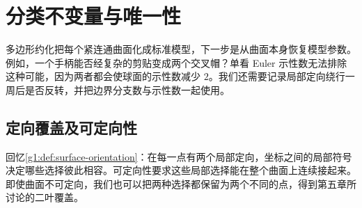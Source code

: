 
% 
% 

\section{分类不变量与唯一性}
\label{g1:sec:0605}

多边形约化把每个紧连通曲面化成标准模型，下一步是从曲面本身恢复模型参数。例如，一个手柄能否经复杂的剪贴变成两个交叉帽？单看 Euler 示性数无法排除这种可能，因为两者都会使球面的示性数减少 \(2\)。我们还需要记录局部定向绕行一周后是否反转，并把边界分支数与示性数一起使用。

\subsection{定向覆盖及可定向性}
\label{g1:subsec:0605:01}

回忆\cref{g1:def:surface-orientation}：在每一点有两个局部定向，坐标之间的局部符号决定哪些选择彼此相容。可定向性要求这些局部选择能在整个曲面上连续接起来。即使曲面不可定向，我们也可以把两种选择都保留为两个不同的点，得到第五章所讨论的二叶覆盖。

